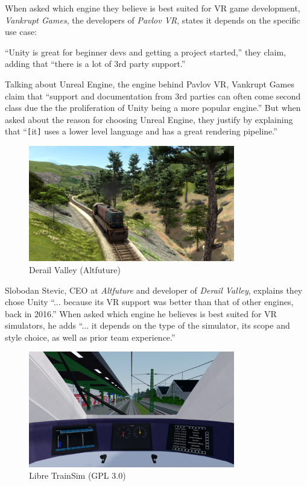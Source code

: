 When asked which engine they believe is best suited for VR game development, \textit{Vankrupt Games}, the developers of \textit{Pavlov VR}, states it depends on the specific use case:

“Unity is great for beginner devs and getting a project started,” they claim, adding that “there is a lot of 3rd party support.”

Talking about Unreal Engine, the engine behind Pavlov VR, Vankrupt Games claim that “support and documentation from 3rd parties can often come second class due the the proliferation of Unity being a more popular engine.” But when asked about the reason for choosing Unreal Engine, they justify by explaining that “\texttt{[}it\texttt{]} uses a lower level language and has a great rendering pipeline.”

\begin{figure}
    \vspace{12pt}
    \includegraphics[width=9cm]{figures/derailvalley.png}
    \caption{Derail Valley (Altfuture)}
\end{figure} 

Slobodan Stevic, CEO at \textit{Altfuture} and developer of \textit{Derail Valley}, explains they chose Unity “... because its VR support was better than that of other engines, back in 2016.” When asked which engine he believes is best suited for VR simulators, he adds “... it depends on the type of the simulator, its scope and style choice, as well as prior team experience.” 


\begin{figure}
    \vspace{12pt}
    \includegraphics[width=9cm]{figures/libre_train_sim.png}
    \caption{Libre TrainSim (GPL 3.0)}
\end{figure} 

